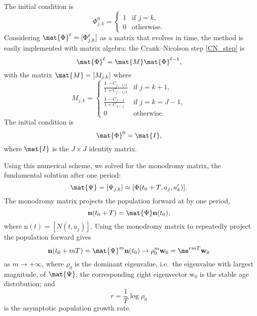 \documentclass{jpmarticle}
\renewcommand{\vec}[1]{\boldsymbol{\mathrm{#1}}}
\begin{document}
The initial condition is
\begin{equation}
  \Phi_{j, k}^0 =
  \begin{cases}
    1 & \text{if $j = k$}, \\
    0 & \text{otherwise}.
  \end{cases}
\end{equation}
Considering $\mat{\Phi}^{\ell} = [\Phi_{j, k}^{\ell}]$ as a matrix
that evolves in time, the method is easily implemented with matrix
algebra: the Crank--Nicolson step \eqref{CN_step} is
\begin{equation}
  \mat{\Phi}^{\ell} = \mat{M} \mat{\Phi}^{\ell - 1},
\end{equation}
with the matrix $\mat{M} = [M_{j, k}]$ where
\begin{equation}
  M_{j, k} =
  \begin{cases}
    \frac{1 - C_{j - 1 / 2}}{1 + C_{j - 1 / 2}}
    & \text{if $j = k + 1$}, \\
    \frac{1 - C_{J - 1}}{1 + C_{J - 1}} & \text{if $j = k = J - 1$}, \\
    0 & \text{otherwise}.
  \end{cases}
\end{equation}
The initial condition is
\begin{equation}
  \mat{\Phi}^0 = \mat{I},
\end{equation}
where $\mat{I}$ is the $J \times J$ identity matrix.

Using this numerical scheme, we solved for the monodromy matrix, the
fundamental solution after one period:
\begin{equation}
  \mat{\Psi} = [\Psi_{j, k}] \approx [\Phi(t_0 + T, a_j, a'_k)].
\end{equation}
The monodromy matrix projects the population forward at by one period,
\begin{equation}
  \vec{n}(t_0 + T) = \mat{\Psi} \vec{n}(t_0),
\end{equation}
where $\vec{n}(t) = [N(t, a_j)]$.
Using the monodromy matrix to repeatedly project the population
forward gives
\begin{equation}
  \vec{n}(t_0 + m T)
  = \mat{\Psi}^m \vec{n}(t_0)
  \to \rho_0^m \vec{w}_0
  = \me^{r m T} \vec{w}_0
\end{equation}
as $m \to +\infty$, where $\rho_0$ is the dominant eigenvalue,
i.e.~the eigenvalue with largest magnitude, of $\mat{\Psi}$;
the corresponding right eigenvector $\vec{w}_0$ is the stable age
distribution; and
\begin{equation}
  r = \frac{1}{T} \log \rho_0
\end{equation}
is the asymptotic population growth rate.
\end{document}
